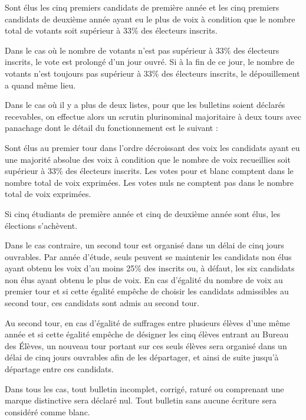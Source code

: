 \documentclass{article}
\begin{document}
				Sont élus les cinq premiers candidats de première année et les
				cinq premiers candidats de deuxième année ayant eu le plus de
				voix à condition que le nombre total de votants soit supérieur à
				33\% des électeurs inscrits.

				Dans le cas où le nombre de votants n’est pas supérieur à 33\%
				des électeurs inscrits, le vote est prolongé d’un jour ouvré. Si
				à la fin de ce jour, le nombre de votants n’est toujours pas
				supérieur à 33\% des électeurs inscrits, le dépouillement a
				quand même lieu.

				Dans le cas où il y a plus de deux listes, pour que les
				bulletins soient déclarés recevables, on effectue alors un
				scrutin plurinominal majoritaire à deux tours avec panachage
				dont le détail du fonctionnement est le suivant :

				Sont élus au premier tour dans l’ordre décroissant des voix les
				candidats ayant eu une majorité absolue des voix à condition que
				le nombre de voix recueillies soit supérieur à 33\% des
				électeurs inscrits. Les votes pour et blanc comptent dans le
				nombre total de voix exprimées. Les votes nuls ne comptent pas
				dans le nombre total de voix exprimées.

				\begin{sloppypar}
					Si cinq étudiants de première année et cinq de deuxième
					année sont élus, les élections s’achèvent.
				\end{sloppypar}
				
				Dans le cas contraire, un second tour est organisé dans un délai
				de cinq jours ouvrables. Par année d’étude, seuls peuvent se
				maintenir les candidats non élus ayant obtenu les voix d’au
				moins 25\% des inscrits ou, à défaut, les six candidats non élus
				ayant obtenu le plus de voix. En cas d’égalité du nombre de voix
				au premier tour et si cette égalité empêche de choisir les
				candidats admissibles au second tour, ces candidats sont admis
				au second tour.

				Au second tour, en cas d'égalité de suffrages entre plusieurs
				élèves d'une même année et si cette égalité empêche de désigner
				les cinq élèves entrant au Bureau des Élèves, un nouveau tour
				portant sur ces seuls élèves sera organisé dans un délai de cinq
				jours ouvrables afin de les départager, et ainsi de suite
				jusqu’à départage entre ces candidats.

				Dans tous les cas, tout bulletin incomplet, corrigé, raturé ou
				comprenant une marque distinctive sera déclaré nul. Tout
				bulletin sans aucune écriture sera considéré comme blanc.
\end{document}
